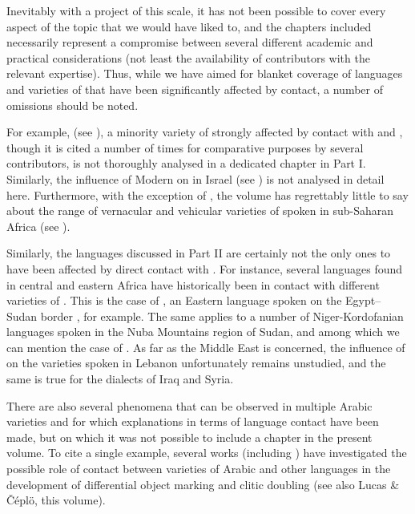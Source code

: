 \documentclass[output=paper]{langsci/langscibook}
\begin{document}
Inevitably with a project of this scale, it has not been possible to cover every  aspect of the topic that we would have liked to, and the chapters included necessarily represent a compromise between several different academic and practical considerations (not least the availability of contributors with the relevant expertise). Thus, while we have aimed for blanket coverage of languages and varieties of  that have been significantly affected by contact, a number of omissions should be noted.

For example,   (see \citealt{Seeger2013article}), a minority variety of  strongly affected by contact with  and , though it is cited a number of times for {comparative} purposes by several contributors, is not thoroughly analysed in a dedicated chapter in Part I. Similarly, the influence of Modern  on   in Israel (see \citealt{Horesh2015}) is not analysed in detail here. Furthermore, with the exception of  , the volume has regrettably little to say about the range of vernacular and vehicular varieties of  spoken in sub-Saharan Africa (see \citealt{Lafkioui2013book}).

 Similarly, the languages discussed in Part II are certainly not the only ones to have been affected by direct contact with . For instance, several  languages found in central and eastern Africa have historically been in contact with different varieties of . This is the case of , an Eastern  language spoken on the Egypt--Sudan border \citep{Rouchdy1980}, for example. The same applies to a number of Niger-Kordofanian languages spoken in the Nuba Mountains region of Sudan, and among which we can mention the case of  \citep{Quint2018}. As far as the Middle East is concerned, the influence of  on the  varieties spoken in Lebanon unfortunately remains unstudied, and the same is true for the  dialects of Iraq and Syria. 
 
 There are also several phenomena that can be observed in multiple Arabic varieties and for which explanations in terms of language contact have been made, but on which it was not possible to include a chapter in the present volume. To cite a single example, several works (including \citealt{Coghill2014,dohla2016,Souag2017clitic}) have investigated the possible role of contact between varieties of Arabic and other languages in the development of differential object marking and clitic doubling (see also Lucas \& Čéplö,  this volume).
\end{document}
